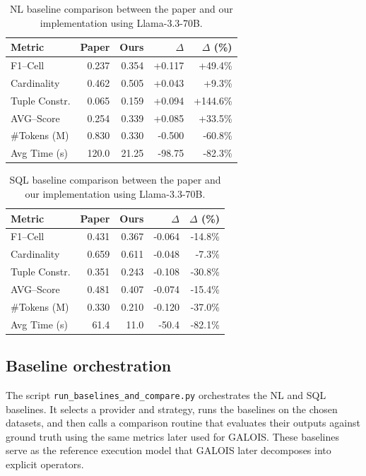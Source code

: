 \documentclass[11pt]{article}
\begin{document}
\begin{table}[h]
\centering
\label{tab:nl}
\begin{tabular}{lrrrr}
\toprule
Metric & Paper & Ours & $\Delta$ & $\Delta$ (\%) \\
\midrule
F1--Cell       & 0.237 & 0.354 & +0.117 & +49.4\% \\
Cardinality    & 0.462 & 0.505 & +0.043 &  +9.3\% \\
Tuple Constr.  & 0.065 & 0.159 & +0.094 & +144.6\% \\
AVG--Score     & 0.254 & 0.339 & +0.085 &  +33.5\% \\
\#Tokens (M)   & 0.830 & 0.330 & -0.500 & -60.8\% \\
Avg Time (s)   & 120.0 & 21.25 & -98.75 & -82.3\% \\
\bottomrule
\end{tabular}
\caption{NL baseline comparison between the paper and our implementation using Llama-3.3-70B.}
\end{table}

\clearpage
\begin{table}[h]
\centering
\label{tab:sql}
\begin{tabular}{lrrrr}
\toprule
Metric & Paper & Ours & $\Delta$ & $\Delta$ (\%) \\
\midrule
F1--Cell       & 0.431 & 0.367 & -0.064 & -14.8\% \\
Cardinality    & 0.659 & 0.611 & -0.048 &  -7.3\% \\
Tuple Constr.  & 0.351 & 0.243 & -0.108 & -30.8\% \\
AVG--Score     & 0.481 & 0.407 & -0.074 & -15.4\% \\
\#Tokens (M)   & 0.330 & 0.210 & -0.120 & -37.0\% \\
Avg Time (s)   & 61.4  & 11.0 & -50.4 & -82.1\% \\
\bottomrule
\end{tabular}
\caption{SQL baseline comparison between the paper and our implementation using Llama-3.3-70B.}
\end{table}

\subsection{Baseline orchestration}

The script \texttt{run\_baselines\_and\_compare.py} orchestrates the NL and SQL baselines. It selects a provider and strategy, runs the baselines on the chosen datasets, and then calls a comparison routine that evaluates their outputs against ground truth using the same metrics later used for GALOIS. These baselines serve as the reference execution model that GALOIS later decomposes into explicit operators.
\end{document}
